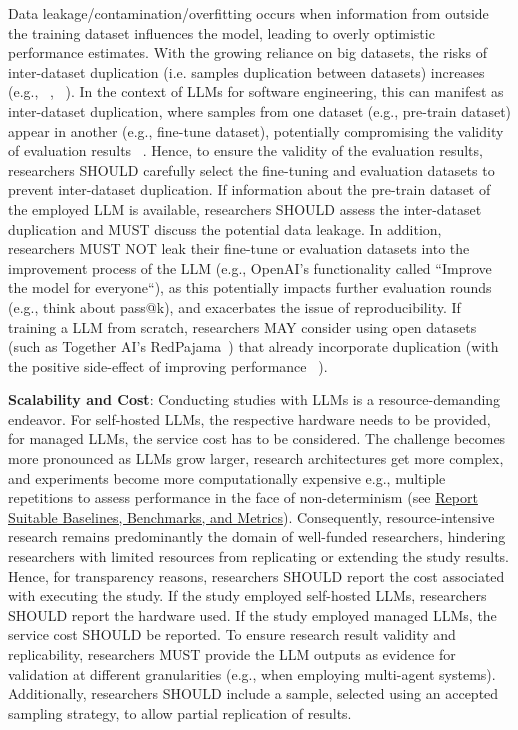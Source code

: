 \begin{itemize}
Data leakage/contamination/overfitting occurs when information from outside the training dataset influences the model, leading to overly optimistic performance estimates. With the growing reliance on big datasets, the risks of inter-dataset duplication (i.e. samples duplication between datasets) increases (e.g., ~\cite{DBLP:journals/pacmpl/LopesMMSYZSV17}, ~\cite{DBLP:conf/oopsla/Allamanis19}). 
In the context of LLMs for software engineering, this can manifest as inter-dataset duplication, where samples from one dataset (e.g., pre-train dataset) appear in another (e.g., fine-tune dataset), potentially compromising the validity of evaluation results ~\cite{DBLP:journals/tse/LopezCSSV25}. 
Hence, to ensure the validity of the evaluation results, researchers SHOULD carefully select the fine-tuning and evaluation datasets to prevent inter-dataset duplication. If information about the pre-train dataset of the employed LLM is available, researchers SHOULD assess the inter-dataset duplication and MUST discuss the potential data leakage.
In addition, researchers MUST NOT leak their fine-tune or evaluation datasets into the improvement process of the LLM (e.g., OpenAI's functionality called ``Improve the model for everyone``), as this potentially impacts further evaluation rounds (e.g., think about pass@k), and exacerbates the issue of reproducibility.
If training a LLM from scratch, researchers MAY consider using open datasets (such as Together AI's RedPajama~\cite{together2023redpajama}) that already incorporate duplication (with the positive side-effect of improving performance ~\cite{DBLP:conf/acl/LeeINZECC22}).

\textbf{Scalability and Cost}:
Conducting studies with LLMs is a resource-demanding endeavor. For self-hosted LLMs, the respective hardware needs to be provided, for managed LLMs, the service cost has to be considered. The challenge becomes more pronounced as LLMs grow larger, research architectures get more complex, and experiments become more computationally expensive e.g., multiple repetitions to assess performance in the face of non-determinism (see \href{/guidelines/report-baselines-benchmarks-and-metrics}{Report Suitable Baselines, Benchmarks, and Metrics}).
Consequently, resource-intensive research remains predominantly the domain of well-funded researchers, hindering researchers with limited resources from replicating or extending the study results.
Hence, for transparency reasons, researchers SHOULD report the cost associated with executing the study. If the study employed self-hosted LLMs, researchers SHOULD report the hardware used. If the study employed managed LLMs, the service cost SHOULD be reported.
To ensure research result validity and replicability, researchers MUST provide the LLM outputs as evidence for validation at different granularities (e.g., when employing multi-agent systems). Additionally, researchers SHOULD include a sample, selected using an accepted sampling strategy, to allow partial replication of results.


\end{itemize}
